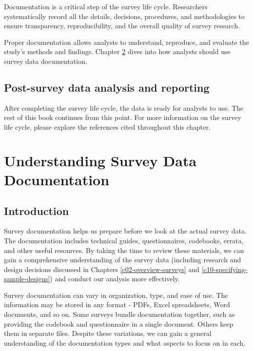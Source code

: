 \documentclass[
]{krantz}
\begin{document}
Documentation is a critical step of the survey life cycle. Researchers systematically record all the details, decisions, procedures, and methodologies to ensure transparency, reproducibility, and the overall quality of survey research.

Proper documentation allows analysts to understand, reproduce, and evaluate the study's methods and findings. Chapter \ref{c03-understanding-survey-data-documentation} dives into how analysts should use survey data documentation.

\hypertarget{post-survey-data-analysis-and-reporting}{%
\section{Post-survey data analysis and reporting}\label{post-survey-data-analysis-and-reporting}}

After completing the survey life cycle, the data is ready for analysts to use. The rest of this book continues from this point. For more information on the survey life cycle, please explore the references cited throughout this chapter.

\hypertarget{c03-understanding-survey-data-documentation}{%
\chapter{Understanding Survey Data Documentation}\label{c03-understanding-survey-data-documentation}}

\hypertarget{introduction-1}{%
\section{Introduction}\label{introduction-1}}

Survey documentation helps us prepare before we look at the actual survey data. The documentation includes technical guides, questionnaires, codebooks, errata, and other useful resources. By taking the time to review these materials, we can gain a comprehensive understanding of the survey data (including research and design decisions discussed in Chapters \ref{c02-overview-surveys} and \ref{c10-specifying-sample-designs}) and conduct our analysis more effectively.

Survey documentation can vary in organization, type, and ease of use. The information may be stored in any format - PDFs, Excel spreadsheets, Word documents, and so on. Some surveys bundle documentation together, such as providing the codebook and questionnaire in a single document. Others keep them in separate files. Despite these variations, we can gain a general understanding of the documentation types and what aspects to focus on in each.
\end{document}
